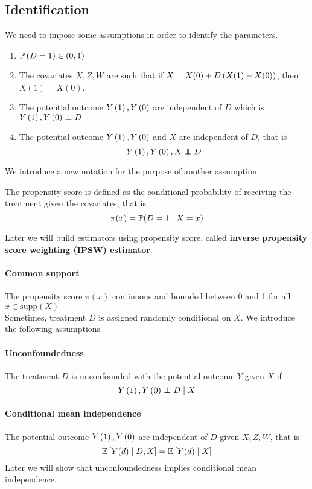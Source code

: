 \subsection{Identification}
We need to impose some assumptions in order to identify the parameters.
\begin{enumerate}
    \item $\mathbb{P}\left(D=1\right)\in \left(0,1\right)$
    \item The covariates $X,Z,W$ are such that if $X=X(0)+D\left(X(1)-X(0)\right)$, then
          $X(1)=X(0)$.
    \item The potential outcome $Y\left(1\right),Y\left(0\right)$ are independent of $D$ which is
          $Y\left(1\right),Y\left(0\right)\perp\!\!\!\!\perp D$
    \item The potential outcome $Y\left(1\right),Y\left(0\right)$ and $X$ are independent of $D$, that is
          $$Y\left(1\right),Y\left(0\right),X \perp\!\!\!\!\perp D$$
\end{enumerate}
We introduce a new notation for the purpose of another assumption.
\begin{definition}
    The propensity score is defined as the conditional probability of receiving the treatment given the covariates, that is \[\pi(x)=\mathbb{P}(D=1\mid X=x)\]
\end{definition}
\begin{remark}
    Later we will build estimators using propensity score, called \textbf{inverse propensity score weighting (IPSW) estimator}.
\end{remark}
\paragraph{Common support}
The propensity score $\pi(x)$ continuous and bounded between 0 and 1 for all
$x\in \text{supp}(X)$ \\

Sometimes, treatment $D$ is assigned randomly conditional on $X$. We introduce
the following assumptions
\paragraph{Unconfoundedness}
The treatment $D$ is unconfounded with the potential outcome $Y$ given $X$ if
\begin{equation*}
    Y\left(1\right),Y\left(0\right)\perp\!\!\!\!\perp D\mid X
\end{equation*}
\paragraph{Conditional mean independence}
The potential outcome $Y\left(1\right),Y\left(0\right)$ are independent of $D$ given $X,Z,W$,
that is \[\mathbb{E}\left[Y(d)\mid D,X\right]=\mathbb{E}\left[Y(d)\mid X\right]\] Later we will show that unconfoundedness implies conditional mean independence.
